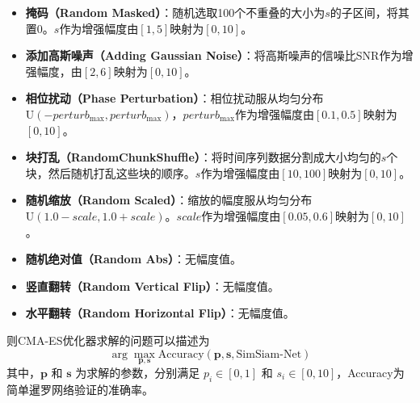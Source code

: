 \documentclass[master]{thesis-uestc}
\begin{document}
\begin{itemize}
    \item \textbf{掩码（Random Masked）}：随机选取100个不重叠的大小为$s$的子区间，将其置0。$s$作为增强幅度由\([1,5]\)映射为\([0,10]\)。

    \item \textbf{添加高斯噪声（Adding Gaussian Noise）}：将高斯噪声的信噪比SNR作为增强幅度，由\([2,6]\)映射为\([0,10]\)。

    \item \textbf{相位扰动（Phase Perturbation）}：相位扰动服从均匀分布$\text{U}(-perturb_{\text{max}}, perturb_{\text{max}})$，$perturb_{\text{max}}$作为增强幅度由\([0.1,0.5]\)映射为\([0,10]\)。

    \item \textbf{块打乱（RandomChunkShuffle）}：将时间序列数据分割成大小均匀的$s$个块，然后随机打乱这些块的顺序。$s$作为增强幅度由\([10,100]\)映射为\([0,10]\)。

    \item \textbf{随机缩放（Random Scaled）}：缩放的幅度服从均匀分布$\text{U}(1.0-scale, 1.0+scale)$。$scale$作为增强幅度由\([0.05,0.6]\)映射为\([0,10]\)。

    \item \textbf{随机绝对值（Random Abs）}：无幅度值。

    \item \textbf{竖直翻转（Random Vertical Flip）}：无幅度值。

    \item \textbf{水平翻转（Random Horizontal Flip）}：无幅度值。
    
\end{itemize}
则CMA-ES优化器求解的问题可以描述为 
\begin{equation}
    \arg\max_{\mathbf{p}, \mathbf{s}} \text{Accuracy}(\mathbf{p}, \mathbf{s}, \text{SimSiam-Net})
\end{equation}
其中，\(\mathbf{p}\) 和 \(\mathbf{s}\) 为求解的参数，分别满足 \(p_i \in [0, 1]\) 和 \(s_i \in [0, 10]\)，Accuracy为简单暹罗网络验证的准确率。
\end{document}
